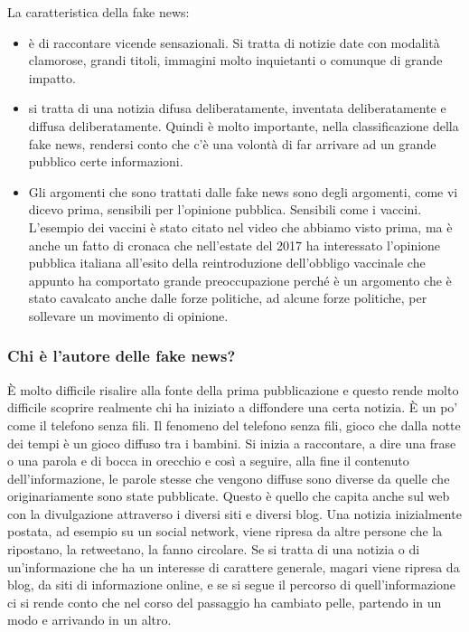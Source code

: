 La caratteristica della fake news:
\begin{itemize}
    \item è di raccontare vicende sensazionali. Si tratta di notizie date con modalità clamorose, grandi titoli, immagini molto inquietanti o comunque di grande impatto. 
    \item si tratta di una notizia difusa deliberatamente, inventata deliberatamente e diffusa deliberatamente. Quindi è molto importante, nella classificazione della fake news, rendersi conto che c'è una volontà di far arrivare ad un grande pubblico certe informazioni.
    \item Gli argomenti che sono trattati dalle fake news sono degli argomenti, come vi dicevo prima, sensibili per l'opinione pubblica. Sensibili come i vaccini. L'esempio dei vaccini è stato citato nel video che abbiamo visto prima, ma è anche un fatto di cronaca che nell'estate del 2017 ha interessato l'opinione pubblica italiana all'esito della reintroduzione dell'obbligo vaccinale che appunto ha comportato grande preoccupazione perché è un argomento che è stato cavalcato anche dalle forze politiche, ad alcune forze politiche, per sollevare un movimento di opinione.
\end{itemize}

\subsubsection{Chi è l'autore delle fake news?}
È molto difficile risalire alla fonte della prima pubblicazione e questo rende molto difficile scoprire realmente chi ha iniziato a diffondere una certa notizia. È un po' come il telefono senza fili. Il fenomeno del telefono senza fili, gioco che dalla notte dei tempi è un gioco diffuso tra i bambini. Si inizia a raccontare, a dire una frase o una parola e di bocca in orecchio e così a seguire, alla fine il contenuto dell'informazione, le parole stesse che vengono diffuse sono diverse da quelle che originariamente sono state pubblicate. Questo è quello che capita anche sul web con la divulgazione attraverso i diversi siti e diversi blog. Una notizia inizialmente postata, ad esempio su un social network, viene ripresa da altre persone che la ripostano, la retweetano, la fanno circolare. Se si tratta di una notizia o di un'informazione che ha un interesse di carattere generale, magari viene ripresa da blog, da siti di informazione online, e se si segue il percorso di quell'informazione ci si rende conto che nel corso del passaggio ha cambiato pelle, partendo in un modo e arrivando in un altro.

